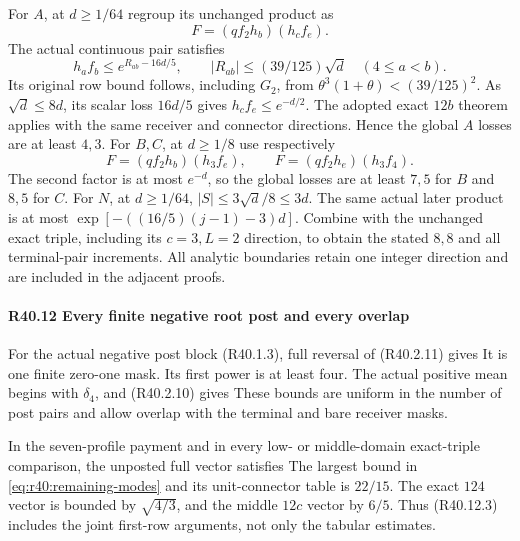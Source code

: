 For \(A\), at \(d\ge1/64\) regroup its unchanged product as
\[
 F=(qf_2h_b)(h_cf_e).
\]
The actual continuous pair satisfies
\begin{equation}\label{eq:r40:remaining-pair-cap}
 h_af_b\le e^{R_{ab}-16d/5},\qquad
 |R_{ab}|\le(39/125)\sqrt d\quad(4\le a<b).
\end{equation}
Its original row bound follows, including \(G_2\), from
\(\theta^3(1+\theta)<(39/125)^2\).
As \(\sqrt d\le8d\), its scalar loss \(16d/5\) gives
\(h_cf_e\le e^{-d/2}\).
The adopted exact \(12b\) theorem applies with the same receiver
and connector directions. Hence the global \(A\) losses are at
least \(4,3\).
For \(B,C\), at \(d\ge1/8\) use respectively
\[
 F=(qf_2h_b)(h_3f_e),\qquad
 F=(qf_2h_e)(h_3f_4).
\]
The second factor is at most \(e^{-d}\), so the global losses are
at least \(7,5\) for \(B\) and \(8,5\) for \(C\).
For \(N\), at \(d\ge1/64\),
\(|S|\le3\sqrt d/8\le3d\).
The same actual later product is at most
\(\exp[-((16/5)(j-1)-3)d]\).
Combine with the unchanged exact triple, including its \(c=3,L=2\)
direction, to obtain the stated \(8,8\) and all terminal-pair increments.
All analytic boundaries retain one integer direction and are included
in the adjacent proofs.

\paragraph{R40.12 Every finite negative root post and every overlap}\label{part:R40.12}

For the actual negative post block (R40.1.3), full reversal of (R40.2.11)
gives
It is one finite zero-one mask. Its first power is at least four.
The actual positive mean begins with \(\delta_4\), and (R40.2.10) gives
These bounds are uniform in the number of post pairs and allow overlap
with the terminal and bare receiver masks.

In the seven-profile payment and in every low- or middle-domain
exact-triple comparison, the unposted full vector satisfies
The largest bound in \eqref{eq:r40:remaining-modes} and its
unit-connector table is \(22/15\).
The exact \(124\) vector is bounded by \(\sqrt{4/3}\), and the
middle \(12c\) vector by \(6/5\). Thus (R40.12.3) includes the joint
first-row arguments, not only the tabular estimates.

